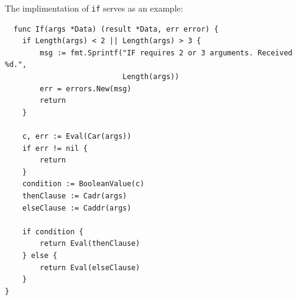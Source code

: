 \documentclass[12pt]{article}
\begin{document}
The implimentation of \verb|if| serves as an example:

\begin{verbatim}
  func If(args *Data) (result *Data, err error) {
    if Length(args) < 2 || Length(args) > 3 {
        msg := fmt.Sprintf("IF requires 2 or 3 arguments. Received %d.", 
                           Length(args))
        err = errors.New(msg)
        return
    }

    c, err := Eval(Car(args))
    if err != nil {
        return
    }
    condition := BooleanValue(c)
    thenClause := Cadr(args)
    elseClause := Caddr(args)

    if condition {
        return Eval(thenClause)
    } else {
        return Eval(elseClause)
    }
}

\end{verbatim}



\end{document}
